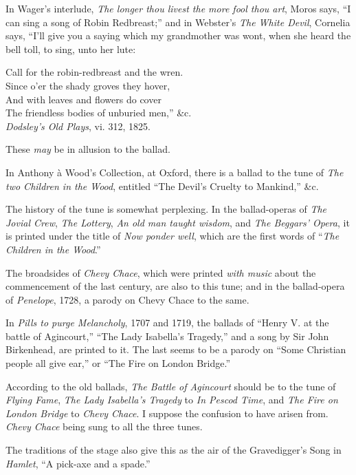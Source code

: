 In Wager’s interlude, \textit{The longer thou livest the more fool thou art}, Moros says,
“I can sing a song of Robin Redbreast;” and in Webster’s \textit{The White Devil},
Cornelia says, “I’ll give you a saying which my grandmother was wont, when
she heard the bell toll, to sing, unto her lute:
\settowidth{\versewidth}{Call for the robin-redbreast and the wren.}
\begin{scverse}
Call for the robin-redbreast and the wren.\\
Since o’er the shady groves they hover,\\
And with leaves and flowers do cover\\
The friendless bodies of unburied men,” \&c.\\
\vin\vin\vin\vin \textit{Dodsley’s Old Plays}, vi. 312, 1825.
\end{scverse}
These \textit{may} be in allusion to the ballad.

In Anthony à Wood’s Collection, at Oxford, there is a ballad to the tune of
\textit{The two Children in the Wood}, entitled “The Devil’s Cruelty to Mankind,” \&c.

The history of the tune is somewhat perplexing. In the ballad-operas of
\textit{The Jovial Crew}, \textit{The Lottery}, \textit{An old man taught wisdom}, and \textit{The Beggars’
Opera}, it is printed under the title of \textit{Now ponder well}, which are the first words
of “\textit{The Children in the Wood}.”

The broadsides of \textit{Chevy Chace}, which were printed \textit{with music} about the commencement
of the last century, are also to this tune; and in the ballad-opera of
\textit{Penelope}, 1728, a parody on Chevy Chace to the same.

In \textit{Pills to purge Melancholy}, 1707 and 1719, the ballads of “Henry V. at the
battle of Agincourt,” “The Lady Isabella’s Tragedy,” and a song by Sir John
Birkenhead, are printed to it. The last seems to be a parody on “Some Christian
people all give ear,” or “The Fire on London Bridge.”

According to the old ballads, \textit{The Battle of Agincourt} should be to the tune of
\textit{Flying Fame}, \textit{The Lady Isabella's Tragedy} to \textit{In Pescod Time}, and \textit{The Fire on
London Bridge} to \textit{Chevy Chace}. I suppose the confusion to have arisen from.
\textit{Chevy Chace} being sung to all the three tunes.

The traditions of the stage also give this as the air of the Gravedigger’s Song
in \textit{Hamlet}, “A pick-axe and a spade.”

\pagebreak